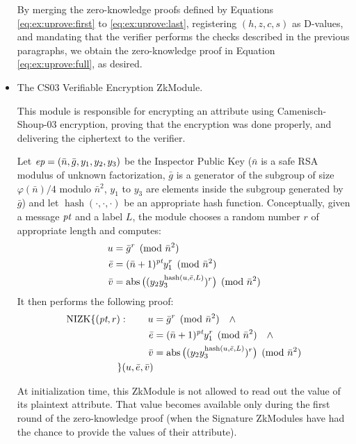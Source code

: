 \begin{itemize}
By merging the zero-knowledge proofs defined by Equations
\ref{eq:ex:uprove:first} to
\ref{eq:ex:uprove:last}, registering $(h, z, c, s)$ as D-values,
and mandating that the verifier performs the checks described in the previous paragraphs,
we obtain the zero-knowledge proof in Equation
\ref{eq:ex:uprove:full}, as desired.

\item The CS03 Verifiable Encryption ZkModule.

This module is responsible for encrypting an attribute using Camenisch-Shoup-03 encryption,
proving that the encryption was done properly, and delivering the
ciphertext to the verifier.

Let $\emph{ep} = (\bar n, \bar g, y_1, y_2, y_3)$ be the Inspector Public Key ($\bar n$ is a safe RSA modulus of
unknown factorization, $\bar g$ is a generator of the subgroup
of size $\varphi(\bar n)/4$ modulo $\bar n^2$, $y_1$ to $y_3$ are elements inside the subgroup generated by $\bar g$) and
let $\operatorname{hash}(\cdot, \cdot, \cdot)$ be an appropriate hash function.
Conceptually, given a message $\emph{pt}$ and a label $L$, the module chooses a random number $r$ of appropriate length and
computes:
\begin{align}
u &= {\bar g}^r \pmod{\bar n^2} \nonumber\\
\bar e &= (\bar n+1)^{\emph{pt}} y_1^r \pmod{\bar n^2} \nonumber\\
\bar v &= \operatorname{abs}\big((y_2 y_3^{\operatorname{hash}(u, \bar e, L)})^r\big) \pmod{\bar n^2}
\end{align}
It then performs the following proof:
\begin{align}
\label{eq:ex:verenc:full}
\operatorname{NIZK}\lbrace(\emph{pt}, r):\qquad
u &= {\bar g}^r \pmod{\bar n^2} \quad\wedge \nonumber\\
\bar e &= (\bar n+1)^{\emph{pt}} y_1^r \pmod{\bar n^2} \quad\wedge\nonumber\\
\bar v &= \operatorname{abs}\big((y_2 y_3^{\operatorname{hash}(u, \bar e, L)})^r\big) \pmod{\bar n^2} \nonumber\\
\rbrace(u, \bar e, \bar v)&
\end{align}

At initialization time, this ZkModule is not allowed to read out the value of its plaintext attribute.
That value becomes available only during the first round of the zero-knowledge proof (when the Signature
ZkModules have had the chance to provide the values of their attribute).


\end{itemize}
